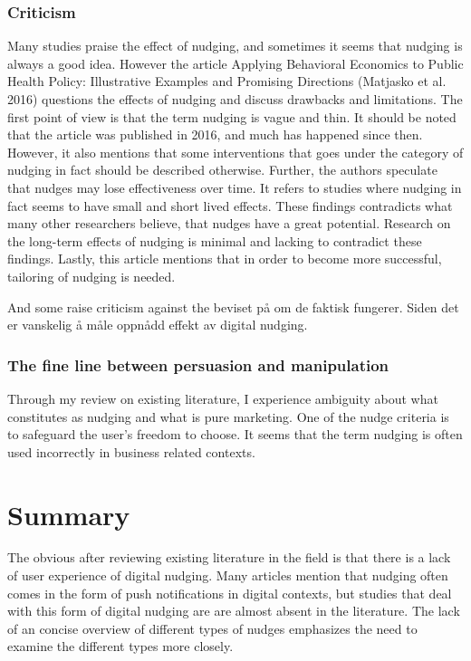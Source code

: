\subsubsection{Criticism}
Many studies praise the effect of nudging, and sometimes it seems that nudging is always a good idea. However the article Applying Behavioral Economics to Public Health Policy: Illustrative Examples and Promising Directions (Matjasko et al. 2016) questions the effects of nudging and discuss drawbacks and limitations. The first point of view is that the term nudging is vague and thin. It should be noted that the article was published in 2016, and much has happened since then. However, it also mentions that some interventions that goes under the category of nudging in fact should be described otherwise. Further, the authors speculate that nudges may lose effectiveness over time. It refers to studies where nudging in fact seems to have small and short lived effects. These findings contradicts what many other researchers believe, that nudges have a great potential. Research on the long-term effects of nudging is minimal and lacking to contradict these findings. Lastly, this article mentions that in order to become more successful, tailoring of nudging is needed. 

And some raise criticism against the beviset på om de faktisk fungerer. Siden det er vanskelig å måle oppnådd effekt av digital nudging. 

\subsubsection{The fine line between persuasion and manipulation }
Through my review on existing literature, I experience ambiguity about what constitutes as nudging and what is pure marketing. One of the nudge criteria is to safeguard the user's freedom to choose. It seems that the term nudging is often used incorrectly in business related contexts.

\section{Summary}
The obvious after reviewing existing literature in the field is that there is a lack of user experience of digital nudging. Many articles mention that nudging often comes in the form of push notifications in digital contexts, but studies that deal with this form of digital nudging are are almost absent in the literature. The lack of an concise overview of different types of nudges emphasizes the need to examine the different types more closely. 

